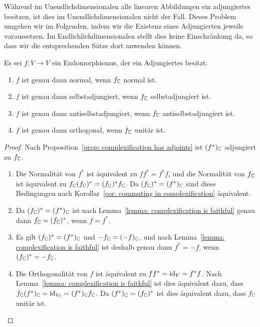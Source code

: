 \documentclass[a4paper,10pt,numbers=noenddot]{scrartcl}
\begin{document}
\begin{remark}
  Während im Unendlichdimensionalen alle linearen Abbildungen ein adjungiertes besitzen, ist dies im Unendlichdimensionalen nicht der Fall.
  Dieses Problem umgehen wir im Folgenden, indem wir die Existenz eines Adjungierten jeweils voraussetzen.
  Im Endlichlichdimensionalen stellt dies keine Einschränkung da, so dass wir die entsprechenden Sätze dort anwenden können.
\end{remark}


\begin{corollary}\label{cor: complexification preserves normally stuff}
  Es sei $f \colon V \to V$ ein Endomorphismus, der ein Adjungiertes besitzt.
  \begin{enumerate}[leftmargin=*]
    \item
      $f$ ist genau dann normal, wenn $f_{\mathbb{C}}$ normal ist.
    \item
      $f$ ist genau dann selbstadjungiert, wenn $f_{\mathbb{C}}$ selbstadjungiert ist.
    \item
      $f$ ist genau dann antiselbstadjungiert, wenn $f_{\mathbb{C}}$ antiselbstadjungiert ist.
    \item
      $f$ ist genau dann orthogonal, wenn $f_{\mathbb{C}}$ unitär ist.
  \end{enumerate}
\end{corollary}


\begin{proof}
  Nach Proposition~\ref{prop: complexification has adjoints} ist $(f^*)_{\mathbb{C}}$ adjungiert zu $f_{\mathbb{C}}$.
  \begin{enumerate}[leftmargin=*]
    \item
      Die Normalität von $f^*$ ist äquivalent zu $f f^* = f^* f$, und die Normalität von $f_{\mathbb{C}}$ ist äquivalent zu $f_{\mathbb{C}} (f_{\mathbb{C}})^* = (f_{\mathbb{C}})^* f_{\mathbb{C}}$.
      Da $(f_{\mathbb{C}})^* = (f^*)_{\mathbb{C}}$ sind diese Bedingungen nach Korollar~\ref{cor: commuting in complexification} äquivalent.
    \item
      Da $(f_{\mathbb{C}})^* = (f^*)_{\mathbb{C}}$ ist nach Lemma~\ref{lemma: complexification is faithful} genau dann $f_{\mathbb{C}} = (f_{\mathbb{C}})^*$, wenn $f = f^*$.
    \item
      Es gilt $(f_{\mathbb{C}})^* = (f^*)_{\mathbb{C}}$ und $-f_{\mathbb{C}} = (-f)_{\mathbb{C}}$, und nach Lemma~\ref{lemma: complexification is faithful} ist deshalb genau dann $f^* = -f$, wenn $(f_{\mathbb{C}})^* = -f_{\mathbb{C}}$.
    \item
      Die Orthogonalität von $f$ ist äquivalent zu $f f^* = \operatorname{id}_V = f^* f$.
      Nach Lemma~\ref{lemma: complexification is faithful} ist dies äquivalent dazu, dass $f_{\mathbb{C}} (f^*)_{\mathbb{C}} = \operatorname{id}_{V_{\mathbb{C}}} = (f^*)_{\mathbb{C}} f_{\mathbb{C}}$.
      Da $(f^*)_{\mathbb{C}} = (f_{\mathbb{C}})^*$ ist dies äquivalent dazu, dass $f_{\mathbb{C}}$ unitär ist.
    \qedhere
  \end{enumerate}
\end{proof}
\end{document}
